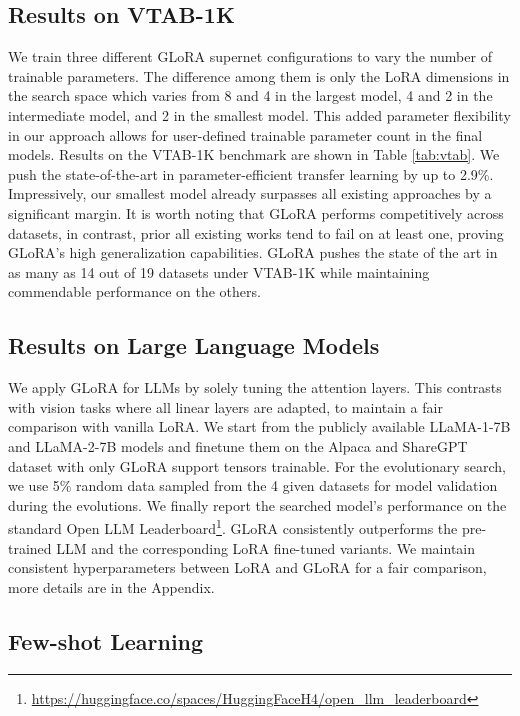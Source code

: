 \subsection{Results on VTAB-1K}

We train three different GLoRA supernet configurations to vary the number of trainable parameters. The difference among them is only the LoRA dimensions in the search space which varies {from} 8 and 4 in the largest model, 4 and 2 in the intermediate model, and 2 in the smallest model. This added parameter flexibility in our approach allows for user-defined trainable parameter count in the final models. Results on the VTAB-1K benchmark are shown in Table \ref{tab:vtab}. We push the state-of-the-art in parameter-efficient transfer learning by up to 2.9\%. Impressively, our smallest model already surpasses all existing approaches by a significant margin. It is worth noting that GLoRA performs competitively across datasets, in contrast, prior all existing works tend to fail on at least one, proving GLoRA's high generalization capabilities. GLoRA pushes the state of the art in as many as 14 out of 19 datasets under VTAB-1K while maintaining commendable performance on the others.

\subsection{Results on Large Language Models}

We apply GLoRA for LLMs by solely tuning the attention layers. This contrasts with vision tasks where all linear layers are adapted, to maintain a fair comparison with vanilla LoRA. We start from the publicly available LLaMA-1-7B \citep{touvron2023llama} and LLaMA-2-7B \citep{touvron2023llama2} models and finetune them on the Alpaca \citep{alpaca} and ShareGPT dataset with only GLoRA support tensors trainable. For the evolutionary search, we use 5\% random data sampled from the 4 given datasets for model validation during the evolutions. We finally report the searched model's performance on the standard Open LLM Leaderboard\footnote{\url{https://huggingface.co/spaces/HuggingFaceH4/open_llm_leaderboard}}. GLoRA consistently outperforms the pre-trained LLM and the corresponding LoRA fine-tuned variants. We maintain consistent hyperparameters between LoRA and GLoRA for a fair comparison, more details are in the Appendix.

\subsection{Few-shot Learning}

